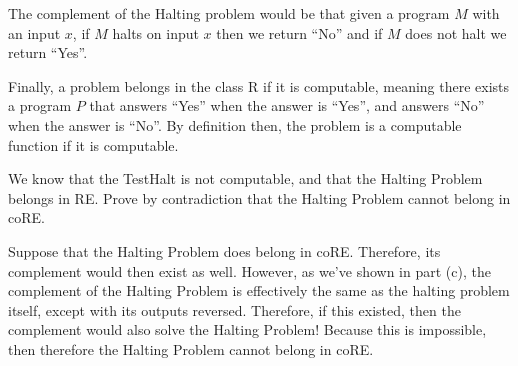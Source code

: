 \documentclass[11pt]{article}
\begin{document}
\begin{Parts}
\begin{solution}
  The complement of the Halting problem would be that given a program $M$ with an input $x$, if $M$ halts on input $x$ then we return ``No'' and if $M$ does not halt we return ``Yes''.
\end{solution}

\Part Finally, a problem belongs in the class \textsf{R} if it is computable, meaning there exists a program $P$ that answers ``Yes'' when the answer is ``Yes'', and answers ``No'' when the answer is ``No''. By definition then, the problem is a computable function if it is computable.

We know that the TestHalt is not computable, and that the Halting Problem belongs in \textsf{RE}. Prove by contradiction that the Halting Problem cannot belong in \textsf{coRE}.

\begin{solution}
  Suppose that the Halting Problem does belong in \textsf{coRE}. Therefore, its complement would then exist as well. However, as we've shown in part (c), the complement of the Halting Problem is effectively the same as the halting problem itself, except with its outputs reversed. Therefore, if this existed, then the complement would also solve the Halting Problem! Because this is impossible, then therefore the Halting Problem cannot belong in \textsf{coRE}.
\end{solution}

\end{Parts}

\pagebreak
{}
\end{document}
